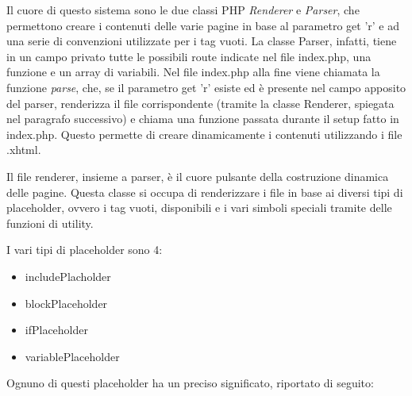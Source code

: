 Il cuore di questo sistema sono le due classi PHP \textit{Renderer} e \textit{Parser}, che permettono creare i contenuti delle varie pagine in base al parametro get 'r' e ad una serie di convenzioni utilizzate per i tag vuoti. La classe Parser, infatti,
tiene in un campo privato tutte le possibili route indicate nel file index.php, una funzione e un array di variabili. Nel file index.php alla fine viene chiamata la funzione \textit{parse}, che, se il parametro get 'r' esiste ed è presente nel campo apposito 
del parser, renderizza il file corrispondente (tramite la classe Renderer, spiegata nel paragrafo successivo) e chiama una funzione passata durante il setup fatto in index.php. Questo permette di creare dinamicamente i contenuti utilizzando i file .xhtml.

Il file renderer, insieme a parser, è il cuore pulsante della costruzione dinamica delle pagine. Questa classe si occupa di renderizzare i file in base ai diversi tipi di placeholder, ovvero i tag vuoti, disponibili e i vari simboli speciali 
tramite delle funzioni di utility. 


I vari tipi di placeholder sono 4:

\begin{itemize}
    
	\item includePlacholder
    \item blockPlaceholder
	\item ifPlaceholder
	\item variablePlaceholder
	
\end{itemize}

Ognuno di questi placeholder ha un preciso significato, riportato di seguito:

